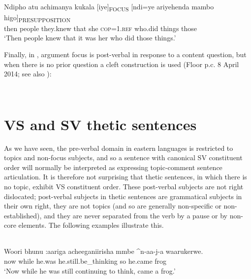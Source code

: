 \documentclass[output=paper]{langsci/langscibook}
\begin{document}
\ea\label{ex:22.nicolle}
\\
\gll Ndipho atu achimanya kukala [iye]\textsubscript{FOCUS} [ndi=ye ariyehenda mambo higo]\textsubscript{PRESUPPOSITION}\\
then people they.knew that {\db}she {\db}\textsc{cop=1.ref} who\textsc{.}did things those \\
\glt ‘Then people knew that it was her who did those things.’
\z

Finally, in , argument focus is post-verbal in response to a content question, but when there is no prior question a cleft construction is used (Floor p.c. 8 April 2014; see also \citealt[9]{floor2005}):

\ea\label{ex:23.nicolle}
\\
\z

\z
\z

\section{VS and SV thetic sentences}\label{§5:vs.nicolle}

As we have seen, the pre-verbal domain in eastern  languages is restricted to topics and non-focus subjects, and so a sentence with canonical SV constituent order will normally be interpreted as expressing topic-comment sentence articulation. It is therefore not surprising that thetic sentences, in which there is no topic, exhibit VS constituent order. These post-verbal subjects are not right dislocated; post-verbal subjects in thetic sentences are grammatical subjects in their own right, they are not topics (and so are generally non-specific or non-established), and they are never separated from the verb by a pause or by non-core elements. The following examples illustrate this.


\ea\label{ex:24.nicolle}
\\
\gll Woori bhunu :aariga acheeganiirisha mmbe \^{}n-aa-j-a waarukerwe.\\
now while he.was he.still.be\_thinking so he.came frog\\
\glt ‘Now while he was still continuing to think, came a frog.’
\z
\end{document}
